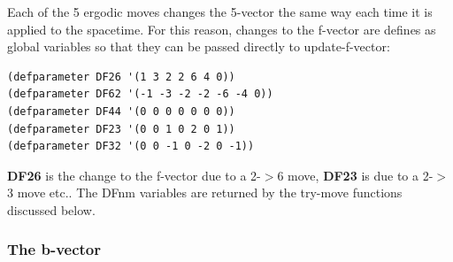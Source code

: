 \message{ !name(programmers_guide.tex)}\documentclass[12pt]{article}
\begin{document}
Each of the 5 ergodic moves changes the 5-vector the same way each
time it is applied to the spacetime. For this reason, changes to the
f-vector are defines as global variables so that they can be passed
directly to update-f-vector:
\begin{lstlisting}
(defparameter DF26 '(1 3 2 2 6 4 0))
(defparameter DF62 '(-1 -3 -2 -2 -6 -4 0))
(defparameter DF44 '(0 0 0 0 0 0 0))
(defparameter DF23 '(0 0 1 0 2 0 1))
(defparameter DF32 '(0 0 -1 0 -2 0 -1))
\end{lstlisting}
\textbf{DF26} is the change to the f-vector due to a 2-$>$6 move,
\textbf{DF23} is due to a 2-$>$3 move etc.. The DFnm variables are
returned by the try-move functions discussed below.

\subsubsection{The b-vector}
\end{document}
